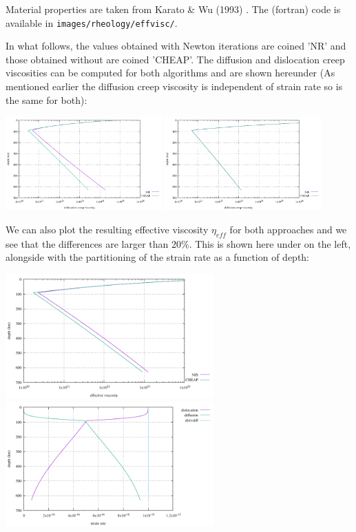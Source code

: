 \begin{itemize}
Material properties are taken from Karato \& Wu (1993) \cite{kawu93}.
The (fortran) code is available in {\tt images/rheology/effvisc/}.

In what follows, the values obtained with Newton iterations are coined 'NR'
and those obtained without are coined 'CHEAP'.
The diffusion and dislocation creep viscosities can be
computed for both algorithms and are shown hereunder
(As mentioned earlier the diffusion creep viscosity is independent of strain rate so
is the same for both):
\begin{center}
\includegraphics[width=6cm]{images/rheology/effvisc/both_mu_ds.pdf}
\includegraphics[width=6cm]{images/rheology/effvisc/both_mu_df.pdf}
\end{center}
We can also plot the resulting effective viscosity 
$\eta_{eff}$ for both approaches and we see that the differences 
are larger than 20\%. This is shown here under on the left, 
alongside with the partitioning of the strain rate as a function of depth:
\begin{center}
\includegraphics[width=8cm]{images/rheology/effvisc/both_mueff.pdf}
\includegraphics[width=8cm]{images/rheology/effvisc/both_sr.pdf}

\end{center}
\end{itemize}

